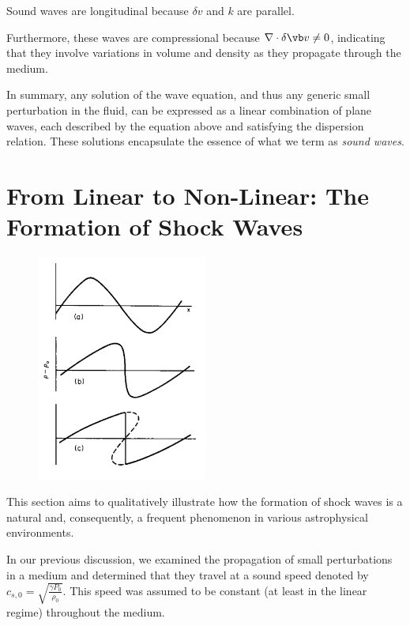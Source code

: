 {\color{red}Sound waves are longitudinal because \( \delta v \) and \( k  \) are parallel.}

Furthermore, these waves are compressional because \( \nabla \cdot \delta \vb v \ne 0 \), indicating that they involve variations in volume and density as they propagate through the medium.

In summary, any solution of the wave equation, and thus any generic small perturbation in the fluid, can be expressed as a linear combination of plane waves, each described by the equation above and satisfying the dispersion relation. These solutions encapsulate the essence of what we term as \emph{sound waves}.




\section{From Linear to Non-Linear: The Formation of Shock Waves}

\begin{figure}[!t]
\centering
\includegraphics[width=0.5\textwidth]{figures/shocklandau.pdf}
\caption{}
\end{figure}

This section aims to qualitatively illustrate how the formation of shock waves is a natural and, consequently, a frequent phenomenon in various astrophysical environments.

In our previous discussion, we examined the propagation of small perturbations in a medium and determined that they travel at a sound speed denoted by \( c_{s,0} = \sqrt{ \frac{\gamma P_0}{\rho_0}} \). This speed was assumed to be constant (at least in the linear regime) throughout the medium.

